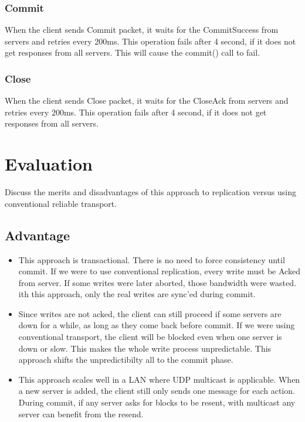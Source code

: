 \documentclass[11pt]{article} %
\begin{document}
\subsubsection{Commit}
When the client sends Commit packet, it waits for the CommitSuccess from servers
and retries every 200ms.
This operation fails after 4 second, if it does not get responses from all servers.
This will cause the commit() call to fail.

\subsubsection{Close}
When the client sends Close packet, it waits for the CloseAck from servers
and retries every 200ms.
This operation fails after 4 second, if it does not get responses from all servers.

\section{Evaluation}
Discuss the merits and disadvantages of this approach to replication 
versus using conventional reliable transport.

\subsection{Advantage}
\begin{itemize}
\item This approach is transactional. 
    There is no need to force consistency until commit.
    If we were to use conventional replication, every write must be Acked from server.
    If some writes were later aborted, those bandwidth were wasted.
    ith this approach, only the real writes are sync'ed during commit.

\item Since writes are not acked, the client can still proceed if some servers
    are down for a while, as long as they come back before commit. 
    If we were using conventional transport, the client will be blocked even when
    one server is down or slow. This makes the whole write process unpredictable.
    This approach shifts the unpredictibilty all to the commit phase.

\item This approach scales well in a LAN where UDP multicast is applicable.
    When a new server is added, the client still only sends one message for each action.
    During commit, if any server asks for blocks to be resent, with multicast
    any server can benefit from the resend. 
\end{itemize}
\end{document}
